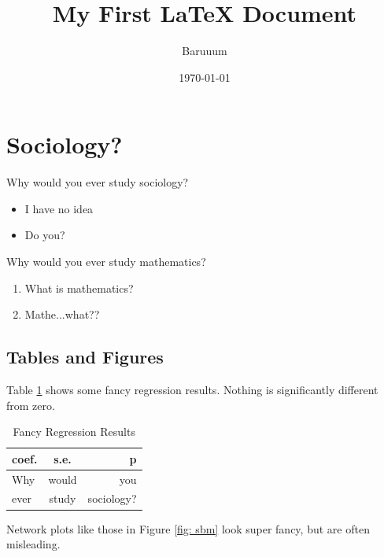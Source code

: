\documentclass[12pt]{article}
\title{My First LaTeX Document}
\author{Baruuum}
\date{\today}
\begin{document}
\maketitle 
	
\section{Sociology?}

Why would you ever study sociology?

\begin{itemize}
	\item I have no idea
	\item Do you?
\end{itemize}

Why would you ever study mathematics?

\begin{enumerate}
	\item What is mathematics?
	\item Mathe...what??
\end{enumerate}

\subsection{Tables and Figures}

Table \ref{tab: freg} shows some fancy regression results. Nothing is significantly different from zero.

\begin{table}[h]
	
	\centering
	
	\caption{Fancy Regression Results}
	
	\begin{tabular}{lcr} \hline \hline
		coef. & s.e. & p \\ \hline
		Why & would & you \\
		ever & study & sociology? \\ \hline
	\end{tabular}
	
	\label{tab: freg}
	
\end{table}

Network plots like those in Figure \ref{fig: sbm} look super fancy, but are often misleading. 
\end{document}
